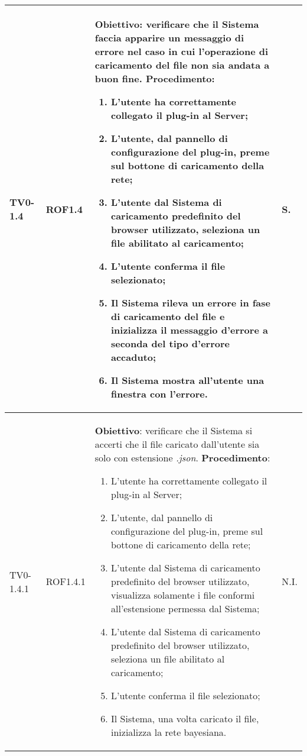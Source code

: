 \begin{longtable}{|C{.15\textwidth}|C{.13\textwidth}|m{.65\textwidth}|C{.08\textwidth}|}
TV0-1.4 & ROF1.4 &
	\textbf{Obiettivo}: verificare che il Sistema faccia apparire un messaggio di errore nel caso in cui l'operazione di caricamento del file non sia andata a buon fine. \newline
	\textbf{Procedimento}:
	\begin{enumerate}
		\item L'utente ha correttamente collegato il plug-in al Server;
		\item L'utente, dal pannello di configurazione del plug-in, preme sul bottone di caricamento della rete;
		\item L'utente dal Sistema di caricamento predefinito del browser utilizzato, seleziona un file abilitato al caricamento;
		\item L'utente conferma il file selezionato;
		\item Il Sistema rileva un errore in fase di caricamento del file e inizializza il messaggio d'errore a seconda del tipo d'errore accaduto;
		\item Il Sistema mostra all'utente una finestra con l'errore.
	\end{enumerate}
	& S. \\
\hline

 TV0-1.4.1 & ROF1.4.1 &
	\textbf{Obiettivo}: verificare che il Sistema si accerti che il file caricato dall'utente sia solo con estensione \textit{.json}. \newline
	\textbf{Procedimento}:
	\begin{enumerate}
		\item L'utente ha correttamente collegato il plug-in al Server;
		\item L'utente, dal pannello di configurazione del plug-in, preme sul bottone di caricamento della rete;
		\item L'utente dal Sistema di caricamento predefinito del browser utilizzato, visualizza solamente i file conformi all'estensione permessa dal Sistema;
		\item L'utente dal Sistema di caricamento predefinito del browser utilizzato, seleziona un file abilitato al caricamento;
		\item L'utente conferma il file selezionato;
		\item Il Sistema, una volta caricato il file, inizializza la rete bayesiana.
	\end{enumerate}
	& N.I. \\
\hline


\end{longtable}
